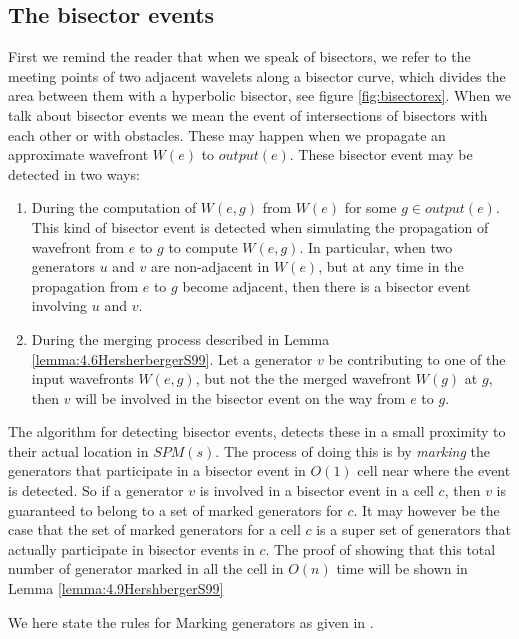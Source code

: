 \subsection{The bisector events} \label{section:bisectorevents}

First we remind the reader that when we speak of bisectors, we refer to the meeting points of 
two adjacent wavelets along a bisector curve, which divides the area between them with a 
hyperbolic bisector, see figure \ref{fig:bisectorex}. When we talk about bisector events we 
mean the event of intersections of bisectors with each other or with obstacles. These may 
happen when we propagate an approximate wavefront $W(e)$ to $output(e)$. These bisector event 
may be detected in two ways:

\begin{enumerate}
\item During the computation of $W(e,g)$ from $W(e)$ for some $g \in output(e)$. This kind of 
	  bisector event is detected when simulating the propagation of wavefront from $e$ to $g$ 
      to compute $W(e,g)$. In particular, when two generators $u$ and $v$ are non-adjacent in 
      $W(e)$, but at any time in the propagation from $e$ to $g$ become adjacent, then there 
      is a bisector event involving $u$ and $v$.
\item During the merging process described in Lemma \ref{lemma:4.6HersherbergerS99}. Let a 
	  generator $v$ be contributing to one of the input wavefronts $W(e,g)$, but not the the 
      merged wavefront $W(g)$ at $g$, then $v$ will be involved in the bisector event on the 
      way from $e$ to $g$.
\end{enumerate}

The algorithm for detecting bisector events, detects these in a small proximity to their 
actual location in $SPM(s)$. The process of doing this is by \textit{marking} the generators 
that participate in a bisector event in $O(1)$ cell near where the event is detected. So if a 
generator $v$ is involved in a bisector event in a cell $c$, then $v$ is guaranteed to belong 
to a set of marked generators for $c$. It may however be the case that the set of marked 
generators for a cell $c$ is a super set of generators that actually participate in bisector 
events in $c$. The proof of showing that this total number of generator marked in all the cell 
in $O(n)$ time will be shown in Lemma \ref{lemma:4.9HershbergerS99}

We here state the rules for Marking generators as given in \cite{HershbergerS99}.

